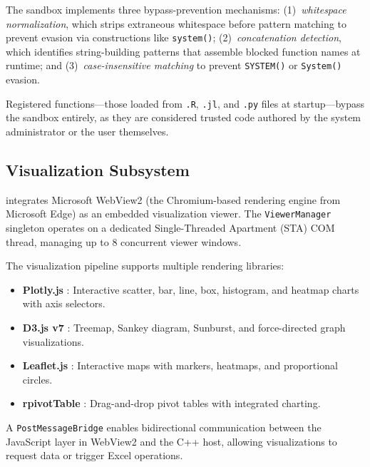 The sandbox implements three bypass-prevention mechanisms: (1)~\emph{whitespace normalization}, which strips extraneous whitespace before pattern matching to prevent evasion via constructions like \texttt{sys\allowbreak tem()}; (2)~\emph{concatenation detection}, which identifies string-building patterns that assemble blocked function names at runtime; and (3)~\emph{case-insensitive matching} to prevent \texttt{SYSTEM()} or \texttt{System()} evasion.

Registered functions---those loaded from \texttt{.R}, \texttt{.jl}, and \texttt{.py} files at startup---bypass the sandbox entirely, as they are considered trusted code authored by the system administrator or the user themselves.

\subsection{Visualization Subsystem}

\neven{} integrates Microsoft WebView2 \citep{WebView2_2023} (the Chromium-based rendering engine from Microsoft Edge) as an embedded visualization viewer. The \texttt{ViewerManager} singleton operates on a dedicated Single-Threaded Apartment (STA) COM thread, managing up to 8 concurrent viewer windows.

The visualization pipeline supports multiple rendering libraries:
\begin{itemize}
    \item \textbf{Plotly.js} \citep{Plotly2023}: Interactive scatter, bar, line, box, histogram, and heatmap charts with axis selectors.
    \item \textbf{D3.js v7} \citep{Bostock2011}: Treemap, Sankey diagram, Sunburst, and force-directed graph visualizations.
    \item \textbf{Leaflet.js} \citep{Leaflet2023}: Interactive maps with markers, heatmaps, and proportional circles.
    \item \textbf{rpivotTable} \citep{rpivotTable2023}: Drag-and-drop pivot tables with integrated charting.
\end{itemize}

A \texttt{PostMessageBridge} enables bidirectional communication between the JavaScript layer in WebView2 and the C++ host, allowing visualizations to request data or trigger Excel operations.
